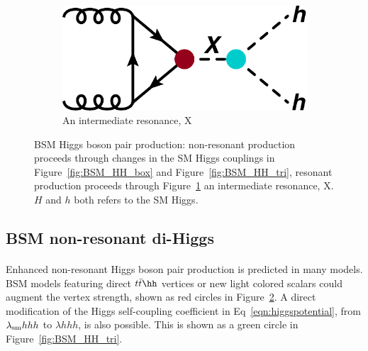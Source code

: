 \begin{figure}[htbp!]
\begin{subfigure}[b]{0.3\textwidth}
        \includegraphics[width=\textwidth]{figures/theory/BSM_HH_X}
        \caption{An intermediate resonance, X}
        \label{fig:BSM_HH_X}
    \end{subfigure}
\caption{BSM Higgs boson pair production: non-resonant production proceeds through changes in the SM Higgs couplings in Figure~\ref{fig:BSM_HH_box} and Figure~\ref{fig:BSM_HH_tri}, resonant production proceeds through Figure~\ref{fig:BSM_HH_X} an intermediate resonance, X. $H$ and $h$ both refers to the SM Higgs.}
\label{fig:BSM_HH}
\end{figure}


\subsection{BSM non-resonant di-Higgs}
\paragraph{}
Enhanced non-resonant Higgs boson pair production is predicted in many models. 
BSM models featuring direct $t\bar{t}\hh$ vertices \cite{Grober:2010yv, Contino:2012xk} or new light colored scalars \cite{PhysRevD.86.095023} could augment the vertex strength, shown as red circles in Figure~\ref{fig:BSM_HH}. 
A direct modification of the Higgs self-coupling coefficient in Eq~\ref{eqn:higgspotential}, from $\lambda_{\rm sm}hhh$ to $\lambda hhh$, is also possible. 
This is shown as a green circle in Figure~\ref{fig:BSM_HH_tri}. 

